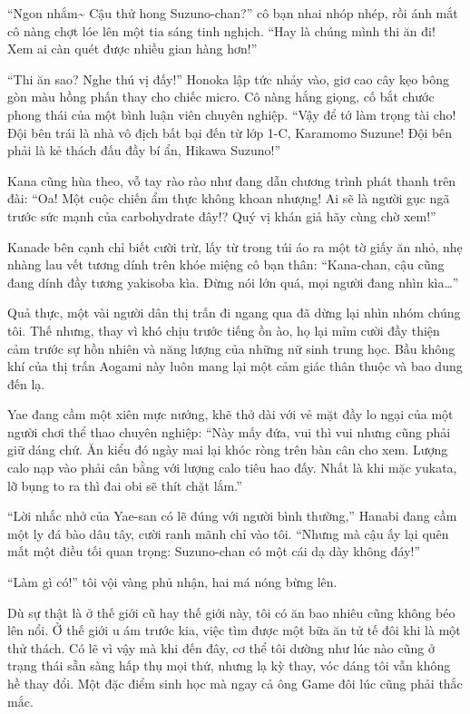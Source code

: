 \documentclass[../main.tex]{subfiles}
\begin{document}
``Ngon nhắm\~{} Cậu thử hong Suzuno-chan?'' cô bạn nhai nhóp nhép, rồi ánh mắt cô nàng chợt lóe lên một tia sáng tinh nghịch. ``Hay là chúng mình thi ăn đi! Xem ai càn quét được nhiều gian hàng hơn!''

``Thi ăn sao? Nghe thú vị đấy!'' Honoka lập tức nhảy vào, giơ cao cây kẹo bông gòn màu hồng phấn thay cho chiếc micro. Cô nàng hắng giọng, cố bắt chước phong thái của một bình luận viên chuyên nghiệp. ``Vậy để tớ làm trọng tài cho! Đội bên trái là nhà vô địch bất bại đến từ lớp 1-C, Karamomo Suzune! Đội bên phải là kẻ thách đấu đầy bí ẩn, Hikawa Suzuno!''

Kana cũng hùa theo, vỗ tay rào rào như đang dẫn chương trình phát thanh trên đài: ``Oa! Một cuộc chiến ẩm thực không khoan nhượng! Ai sẽ là người gục ngã trước sức mạnh của carbohydrate đây!? Quý vị khán giả hãy cùng chờ xem!''

Kanade bên cạnh chỉ biết cười trừ, lấy từ trong túi áo ra một tờ giấy ăn nhỏ, nhẹ nhàng lau vết tương dính trên khóe miệng cô bạn thân: ``Kana-chan, cậu cũng đang dính đầy tương yakisoba kìa. Đừng nói lớn quá, mọi người đang nhìn kìa\dots''

Quả thực, một vài người dân thị trấn đi ngang qua đã dừng lại nhìn nhóm chúng tôi. Thế nhưng, thay vì khó chịu trước tiếng ồn ào, họ lại mỉm cười đầy thiện cảm trước sự hồn nhiên và năng lượng của những nữ sinh trung học. Bầu không khí của thị trấn Aogami này luôn mang lại một cảm giác thân thuộc và bao dung đến lạ.

Yae đang cầm một xiên mực nướng, khẽ thở dài với vẻ mặt đầy lo ngại của một người chơi thể thao chuyên nghiệp: ``Này mấy đứa, vui thì vui nhưng cũng phải giữ dáng chứ. Ăn kiểu đó ngày mai lại khóc ròng trên bàn cân cho xem. Lượng calo nạp vào phải cân bằng với lượng calo tiêu hao đấy. Nhất là khi mặc yukata, lỡ bụng to ra thì đai obi sẽ thít chặt lắm.''

``Lời nhắc nhở của Yae-san có lẽ đúng với người bình thường,'' Hanabi đang cầm một ly đá bào dâu tây, cười ranh mãnh chỉ vào tôi. ``Nhưng mà cậu ấy lại quên mất một điều tối quan trọng: Suzuno-chan có một cái dạ dày không đáy!''

``Làm gì có!'' tôi vội vàng phủ nhận, hai má nóng bừng lên.

Dù sự thật là ở thế giới cũ hay thế giới này, tôi có ăn bao nhiêu cũng không béo lên nổi. Ở thế giới u ám trước kia, việc tìm được một bữa ăn tử tế đôi khi là một thử thách. Có lẽ vì vậy mà khi đến đây, cơ thể tôi dường như lúc nào cũng ở trạng thái sẵn sàng hấp thụ mọi thứ, nhưng lạ kỳ thay, vóc dáng tôi vẫn không hề thay đổi. Một đặc điểm sinh học mà ngay cả ông Game đôi lúc cũng phải thắc mắc.
\end{document}
